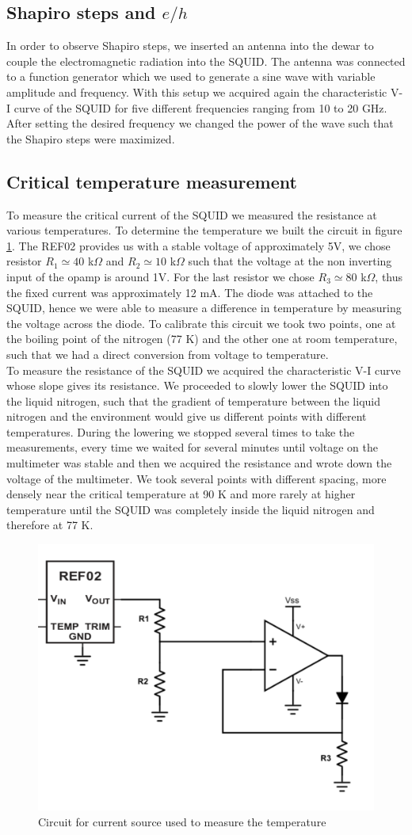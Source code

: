 \documentclass[a4paper,10pt]{article}
\begin{document}
\subsection{Shapiro steps and $e/h$}
In order to observe Shapiro steps, we inserted an antenna into the dewar to couple the electromagnetic radiation into the SQUID. The antenna was connected to a function generator which we used to generate a sine wave with variable amplitude and frequency. With this setup we acquired again the characteristic V-I curve of the SQUID for five different frequencies ranging from 10 to 20 GHz. After setting the desired frequency we changed the power of the wave such that the Shapiro steps were maximized.
\subsection{Critical temperature measurement}
To measure the critical current of the SQUID we measured the resistance at various temperatures. To determine the temperature we built the circuit in figure \ref{circuit}. The REF02 provides us with a stable voltage of approximately 5V, we chose resistor $R_1 \simeq 40$ k$\Omega$ and $R_2 \simeq 10$ k$\Omega$ such that the voltage at the non inverting input of the opamp is around 1V. For the last resistor  we chose $R_3 \simeq 80$ k$\Omega$, thus the fixed current was approximately 12 mA. The diode was attached to the SQUID, hence we were able to measure a difference in temperature by measuring the voltage across the diode. To calibrate this circuit we took two points, one at the boiling point of the nitrogen (77 K) and the other one at room temperature, such that we had a direct conversion from voltage to temperature.\\
To measure the resistance of the SQUID we acquired the characteristic V-I curve whose slope gives its resistance. We proceeded to slowly lower the SQUID into the liquid nitrogen, such that the gradient of temperature between the liquid nitrogen and the environment would give us different points with different temperatures. During the lowering we stopped several times to take the measurements, every time we waited for several minutes until voltage on the multimeter was stable and then we acquired the resistance and wrote down the voltage of the multimeter.
We took several points with different spacing, more densely near the critical temperature at 90 K and more rarely at higher temperature until the SQUID was completely inside the liquid nitrogen and therefore at 77 K.
\begin{figure}[H]
\centering
\includegraphics[width = .5\textwidth]{circuit}
\caption{Circuit for current source used to measure the temperature}\label{circuit}
\end{figure}
\end{document}
